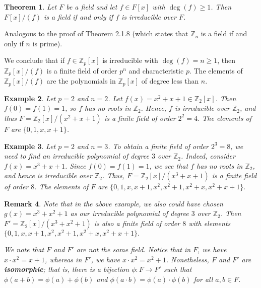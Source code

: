 \documentclass[10pt]{article}
\makeatletter
\newcommand{\Z}{\mathbb{Z}}
\theoremstyle{newstyle}
\newtheorem{thm}{Theorem}[subsection]
\newtheorem{remark}[thm]{Remark}
\newtheorem{exmp}[thm]{Example}
\newenvironment{pf}[1][\proofname]{\par
  \pushQED{\qed}%
  \normalfont \topsep0\p@\relax
  \trivlist
  \item[\hskip\labelsep\scshape
  #1\@addpunct{.}]\ignorespaces
}{%
  \popQED\endtrivlist\@endpefalse
}
\makeatother
\begin{document}
\begin{thm}
Let $F$ be a field and let $f \in F[x]$ with $\deg(f) \geq 1$. Then 
$F[x]/(f)$ is a field if and only if $f$ is irreducible over $F$. 
\end{thm}
\begin{pf}
Analogous to the proof of Theorem 2.1.8 (which states that $\Z_n$ is a field if and only if $n$ is prime).
\end{pf}

We conclude that if $f \in \Z_p[x]$ is irreducible with $\deg(f) = n \geq 1$, 
then $\Z_p[x]/(f)$ is a finite field of order $p^n$ and 
characteristic $p$. The elements of $\Z_p[x]/(f)$ are the polynomials in 
$\Z_p[x]$ of degree less than $n$.

\begin{exmp}
Let $p = 2$ and $n = 2$. Let $f(x) = x^2 + x + 1 \in \Z_2[x]$.
Then $f(0) = f(1) = 1$, so $f$ has no roots in $\Z_2$. Hence, $f$ is irreducible over $\Z_2$, 
and thus $F = \Z_2[x]/(x^2 + x + 1)$ is a finite field of order $2^2 = 4$. The 
elements of $F$ are $\{0, 1, x, x+1\}$.
\end{exmp}

\begin{exmp}
Let $p = 2$ and $n = 3$. To obtain a finite field of order $2^3 = 8$, we need to find an 
irreducible polynomial of degree $3$ over $\Z_2$. Indeed, consider 
$f(x) = x^3 + x + 1$. Since $f(0) = f(1) = 1$, we see that $f$ has no roots in $\Z_2$, 
and hence is irreducible over $\Z_2$. Thus, $F = \Z_2[x]/(x^3 + x + 1)$ is a finite 
field of order $8$. The elements of $F$ are 
$\{0, 1, x, x+1, x^2, x^2+1, x^2+x, x^2+x+1\}.$
\end{exmp}

\begin{remark}
Note that in the above example, we also could have chosen $g(x) = x^3 + x^2 + 1$ 
as our irreducible polynomial of degree $3$ over $\Z_2$. Then 
$F' = \Z_2[x]/(x^3 + x^2 + 1)$ is also a finite field of order $8$ with elements 
$\{0, 1, x, x+1, x^2, x^2+1, x^2+x, x^2+x+1\}.$

We note that $F$ and $F'$ are {\it not} the same field. Notice that in 
$F$, we have $x \cdot x^2 = x+1$, whereas in $F'$, we have 
$x \cdot x^2 = x^2 + 1$. Nonetheless, $F$ and $F'$ are {\bf isomorphic}; 
that is, there is a bijection $\phi : F \to F'$ such that 
$\phi(a+b) = \phi(a) + \phi(b)$ and $\phi(a \cdot b) = \phi(a) \cdot \phi(b)$ for all 
$a, b \in F$.
\end{remark}
\end{document}
